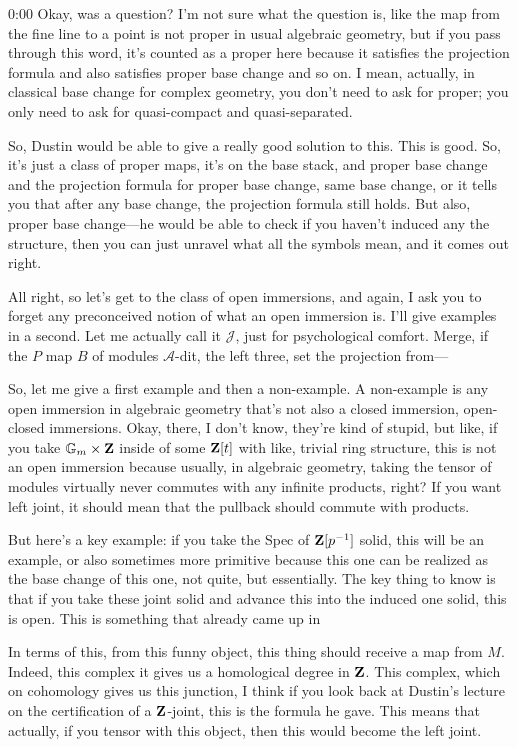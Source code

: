 \begin{unfinished}{0:00}
Okay, was a question? I'm not sure what the question is, like the map from the fine line to a point is not proper in usual algebraic geometry, but if you pass through this word, it's counted as a proper here because it satisfies the projection formula and also satisfies proper base change and so on. I mean, actually, in classical base change for complex geometry, you don't need to ask for proper; you only need to ask for quasi-compact and quasi-separated.

So, Dustin would be able to give a really good solution to this. This is good. So, it's just a class of proper maps, it's on the base stack, and proper base change and the projection formula for proper base change, same base change, or it tells you that after any base change, the projection formula still holds. But also, proper base change---he would be able to check if you haven't induced any the structure, then you can just unravel what all the symbols mean, and it comes out right.

All right, so let's get to the class of open immersions, and again, I ask you to forget any preconceived notion of what an open immersion is. I'll give examples in a second. Let me actually call it $\mathcal{J}$, just for psychological comfort. Merge, if the $P$ map $B$ of modules $\mathcal{A}$-dit, the left three, set the projection from---

So, let me give a first example and then a non-example. A non-example is any open immersion in algebraic geometry that's not also a closed immersion, open-closed immersions. Okay, there, I don't know, they're kind of stupid, but like, if you take $\mathbb{G}_m \times \mathbf Z$ inside of some $\mathbf Z[t]$ with like, trivial ring structure, this is not an open immersion because usually, in algebraic geometry, taking the tensor of modules virtually never commutes with any infinite products, right? If you want left joint, it should mean that the pullback should commute with products.

But here's a key example: if you take the Spec of $\mathbf Z[p^{-1}]$ solid, this will be an example, or also sometimes more primitive because this one can be realized as the base change of this one, not quite, but essentially. The key thing to know is that if you take these joint solid and advance this into the induced one solid, this is open. This is something that already came up in

In terms of this, from this funny object, this thing should receive a map from $M$. Indeed, this complex it gives us a homological degree in $\mathbf Z$. This complex, which on cohomology gives us this junction, I think if you look back at Dustin's lecture on the certification of a $\mathbf Z$-joint, this is the formula he gave. This means that actually, if you tensor with this object, then this would become the left joint. 


\end{unfinished}
